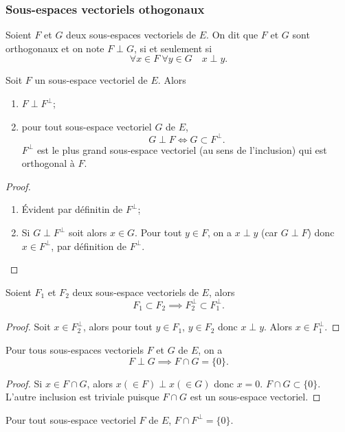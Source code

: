 \subsubsection{Sous-espaces vectoriels othogonaux}

\begin{defdef}
  Soient $F$ et $G$ deux sous-espaces vectoriels de $E$. On dit que $F$ et $G$ sont orthogonaux et on note $F \perp G$, si et seulement si
  \begin{equation}
    \forall x \in F \ \forall y \in G \quad x \perp y.
  \end{equation}
\end{defdef}
\begin{prop}
  Soit $F$ un sous-espace vectoriel de $E$. Alors
  \begin{enumerate}
  \item $F \perp F^\perp$;
  \item pour tout sous-espace vectoriel $G$ de $E$,
    \begin{equation}
      G \perp F \iff G \subset F^\perp.
    \end{equation}
    $F^\perp$ est le plus grand sous-espace vectoriel (au sens de l'inclusion) qui est orthogonal à $F$.
  \end{enumerate}
\end{prop}
\begin{proof}
  \begin{enumerate}
  \item Évident par définitin de $F^\perp$;
  \item Si $G \perp F^\perp$ soit alors $x \in G$. Pour tout $y \in F$, on a $x \perp y$ (car $G \perp F$) donc $x \in F^\perp$, par définition de $F^\perp$.
  \end{enumerate}
\end{proof}
\begin{prop}
  Soient $F_1$ et $F_2$ deux sous-espace vectoriels de $E$, alors
  \begin{equation}
    F_1 \subset F_2 \implies F_2^\perp \subset F_1^\perp.
  \end{equation}
\end{prop}
\begin{proof}
  Soit $x \in F_2^\perp$, alors pour tout $y \in F_1$, $y \in F_2$ donc $x \perp y$. Alors $x \in F_1^\perp$.
\end{proof}
\begin{prop}
  Pour tous sous-espaces vectoriels $F$ et $G$ de $E$, on a
  \begin{equation}
    F \perp G \implies F \cap G = \{0\}.
  \end{equation}
\end{prop}
\begin{proof}
  Si $x \in F \cap G$, alors $x (\in F) \perp x (\in G)$ donc $x=0$.  $F \cap G \subset \{0\}$. L'autre inclusion est triviale puisque $F \cap G$ est un sous-espace vectoriel.
\end{proof}
\begin{cor}
  Pour tout sous-espace vectoriel $F$ de $E$, $F \cap F^\perp =\{0\}$.
\end{cor}

